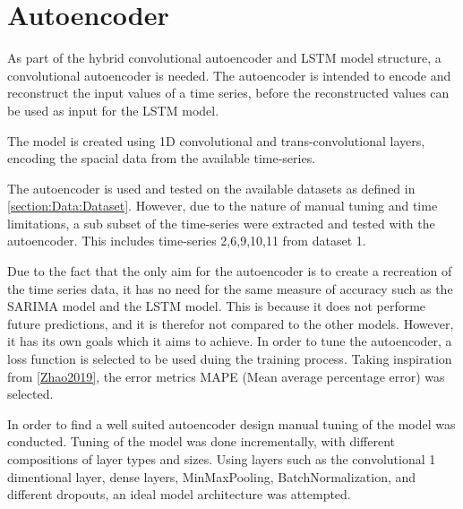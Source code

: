 
\section{Autoencoder}
\label{section:Method:AE}



As part of the hybrid convolutional autoencoder and LSTM model structure,
a convolutional autoencoder is needed.
The autoencoder is intended to encode and reconstruct the input values of a time series,
before the reconstructed values can be used as input for the LSTM model.

The model is created using 1D convolutional and trans-convolutional layers,
encoding the spacial data from the available time-series.

The autoencoder is used and tested on the available datasets as defined in \cref{section:Data:Dataset}.
However, due to the nature of manual tuning and time limitations, a sub subset of the time-series were extracted and tested with the autoencoder.
This includes time-series 2,6,9,10,11 from dataset 1.


Due to the fact that the only aim for the autoencoder is to create a recreation of the time series data,
it has no need for the same measure of accuracy such as the SARIMA model and the LSTM model.
This is because it does not performe future predictions, and it is therefor not compared to the other models.
However, it has its own goals which it aims to achieve.
In order to tune the autoencoder, a loss function is selected to be used duing the training process.
Taking inspiration from \cref{Zhao2019}, the error metrics MAPE (Mean average percentage error) was selected.


In order to find a well suited autoencoder design manual tuning of the model was conducted.
Tuning of the model was done incrementally, with different compositions of layer types and sizes.
Using layers such as the convolutional 1 dimentional layer, dense layers, MinMaxPooling, BatchNormalization, and different dropouts,
an ideal model architecture was attempted.

